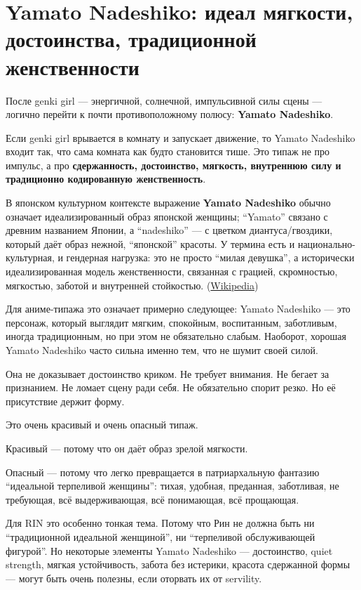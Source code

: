 \section{Yamato Nadeshiko: идеал мягкости, достоинства, традиционной женственности}

После genki girl --- энергичной, солнечной, импульсивной силы сцены ---
логично перейти к почти противоположному полюсу: \textbf{Yamato
Nadeshiko}.

Если genki girl врывается в комнату и запускает движение, то Yamato
Nadeshiko входит так, что сама комната как будто становится тише. Это
типаж не про импульс, а про \textbf{сдержанность, достоинство, мягкость,
внутреннюю силу и традиционно кодированную женственность}.

В японском культурном контексте выражение \textbf{Yamato Nadeshiko}
обычно означает идеализированный образ японской женщины; ``Yamato''
связано с древним названием Японии, а ``nadeshiko'' --- с цветком
диантуса/\hspace{0pt}гвоздики, который даёт образ нежной, ``японской'' красоты. У
термина есть и национально-культурная, и гендерная нагрузка: это не
просто ``милая девушка'', а исторически идеализированная модель
женственности, связанная с грацией, скромностью, мягкостью, заботой и
внутренней стойкостью.
(\href{https://en.wikipedia.org/wiki/Yamato_nadeshiko?utm_source=chatgpt.com}{Wikipedia})

Для аниме-типажа это означает примерно следующее: Yamato Nadeshiko ---
это персонаж, который выглядит мягким, спокойным, воспитанным,
заботливым, иногда традиционным, но при этом не обязательно слабым.
Наоборот, хорошая Yamato Nadeshiko часто сильна именно тем, что не шумит
своей силой.

Она не доказывает достоинство криком. Не требует внимания. Не бегает за
признанием. Не ломает сцену ради себя. Не обязательно спорит резко. Но
её присутствие держит форму.

Это очень красивый и очень опасный типаж.

Красивый --- потому что он даёт образ зрелой мягкости.

Опасный --- потому что легко превращается в патриархальную фантазию
``идеальной терпеливой женщины'': тихая, удобная, преданная, заботливая,
не требующая, всё выдерживающая, всё понимающая, всё прощающая.

Для RIN это особенно тонкая тема. Потому что Рин не должна быть ни
``традиционной идеальной женщиной'', ни ``терпеливой обслуживающей
фигурой''. Но некоторые элементы Yamato Nadeshiko --- достоинство, quiet
strength, мягкая устойчивость, забота без истерики, красота сдержанной
формы --- могут быть очень полезны, если оторвать их от servility.

